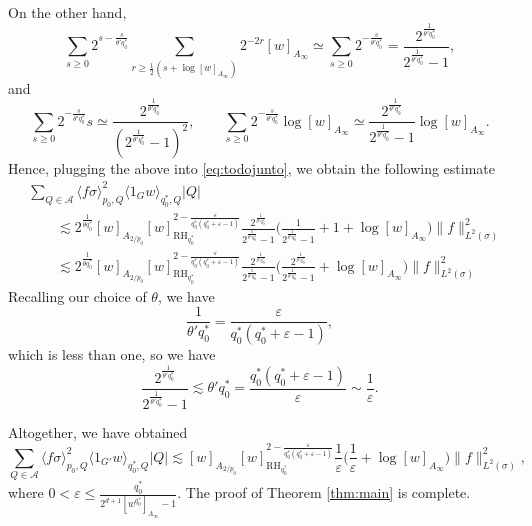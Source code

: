 \documentclass[11pt,reqno]{amsart}
\theoremstyle{plain} %
\newcommand{\1}{ \mathbbm{1}}   %
\theoremstyle{definition}
\theoremstyle{remark}
\numberwithin{equation}{section}
\begin{document}
On the other hand, 
$$
\sum_{s\ge 0} 2^{s-\frac{s}{\theta'q_0^*}}\sum_{r\ge\frac12(s+\log[w]_{A_{\infty}})}2^{-2r}[w]_{A_{\infty}}\simeq \sum_{s\ge 0} 2^{-\frac{s}{\theta'q_0^*}}= \frac{2^{\frac{1}{\theta' q_0^*}}}{2^{\frac{1}{\theta' q_0^*}}-1}, 
$$
and 
$$
\sum_{s\ge0}2^{-\frac{s}{\theta'q_0^*}}s \simeq \frac{2^{\frac{1}{\theta' q_0^*}}}{(2^{\frac{1}{\theta' q_0^*}}-1)^2},\qquad \sum_{s\ge0}2^{-\frac{s}{\theta'q_0^*}}\log[w]_{A_{\infty}}\simeq\frac{2^{\frac{1}{\theta' q_0^*}}}{2^{\frac{1}{\theta' q_0^*}}-1}\log[w]_{A_{\infty}}.
$$
Hence, plugging the above into \eqref{eq:todojunto}, we obtain the following estimate 
\begin{align*}
&\sum_{Q\in\mathcal A} \langle f \sigma \rangle^2_{p_0,Q} \langle 1_{G}w  \rangle_{q_0^*, Q}|Q|\\ 
& \qquad \lesssim  2^{\frac{1}{\theta q_0^*}} [w]_{A_{2/p_0}}  [w]_{\operatorname{RH}_{q_0^*}}^{2-\frac{\varepsilon}{q_0^*(q_0^*+\varepsilon-1)}}\frac{2^{\frac{1}{\theta' q_0^*}}}{2^{\frac{1}{\theta' q_0^*}}-1}\bigg(\frac{1}{2^{\frac{1}{\theta' q_0^*}}-1}+1+\log[w]_{A_{\infty}}\bigg) \|f\|_{L^{2}(\sigma)}^{2}\\
& \qquad \lesssim 2^{\frac{1}{\theta q_0^*}} [w]_{A_{2/p_0}} [w]_{\operatorname{RH}_{q_0^*}}^{2-\frac{\varepsilon}{q_0^*(q_0^*+\varepsilon-1)}}\frac{2^{\frac{1}{\theta' q_0^*}}}{2^{\frac{1}{\theta' q_0^*}}-1}\bigg(\frac{2^{\frac{1}{\theta' q_0^*}}}{2^{\frac{1}{\theta' q_0^*}}-1}+\log[w]_{A_{\infty}}\bigg) \|f\|_{L^{2}(\sigma)}^{2}
\end{align*}
Recalling our choice of $\theta$, we have
$$
\frac{1}{\theta' q_0^*}=\frac{\varepsilon}{q_0^*(q_0^*+\varepsilon-1)},
$$
which is less than one, so we have
$$
\frac{2^{\frac{1}{\theta' q_0^*}}}{2^{\frac{1}{\theta' q_0^*}}-1}\lesssim \theta' q_0^* = \frac{q_0^*(q_0^*+\varepsilon-1)}{\varepsilon}\sim \frac{1}{\varepsilon}. 
$$




Altogether, we have obtained 
\begin{equation*}
\sum_{Q\in\mathcal A} \langle f \sigma \rangle^2_{p_0,Q} \langle 1_{G'}w  \rangle_{q_0^*, Q}|Q|  \lesssim [w]_{A_{2/p_0}} [w]_{ \operatorname{RH}_{q_0^*}}^{2-\frac{\varepsilon}{q_0^*(q_0^*+\varepsilon-1)}}  \frac{1}{\varepsilon}\bigg(\frac{1}{\varepsilon}+\log[w]_{A_{\infty}}\bigg) \|f\|_{L^2(\sigma)}^2,
\end{equation*}
where $0<\varepsilon \leq \frac{q_0^*}{2^{d+1} [w^{q_0^*}]_{A_{\infty}}-1}$. The proof of Theorem \ref{thm:main} is complete.
\end{document}
